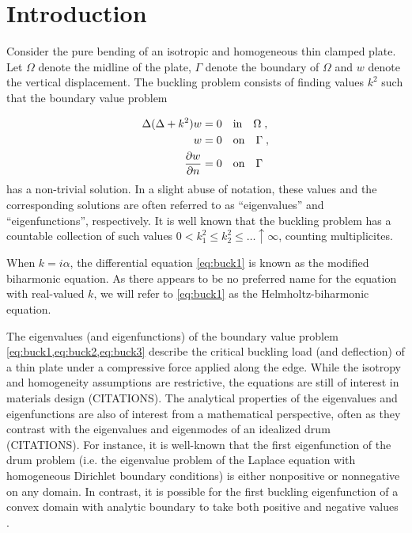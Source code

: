 \section{Introduction}


Consider the pure bending of an isotropic and homogeneous thin clamped
plate. 
Let $\Omega$ denote the midline of the plate, $\Gamma$ denote the 
boundary of $\Omega$ and $w$ denote the vertical displacement.
The buckling problem consists of finding 
values $k^{2}$ such that the boundary value problem

\begin{align}
\Delta (\Delta + k^2) w &= 0 \quad \textrm{in} \quad \Omega \label{eq:buck1} \; , \\
w &= 0 \quad \textrm{on} \quad \Gamma \label{eq:buck2} \; ,\\
\frac{\partial w}{\partial n} &=0 \quad \textrm{on} \quad \Gamma \label{eq:buck3} 
\end{align}
has a non-trivial solution. In a slight abuse of notation,
these values and the corresponding solutions are often
referred to as ``eigenvalues'' and ``eigenfunctions'',
respectively. 
It is well known that the buckling problem has a
countable collection of such values
$0 < k_{1}^{2} \leq k_{2}^2 \leq \ldots \uparrow \infty$,
counting multiplicites.

\begin{remark}
  When $k = i\alpha$, the differential equation
  \cref{eq:buck1} is known as the modified biharmonic
  equation. As there appears to be no preferred
  name for the equation with real-valued $k$,
  we will refer to \cref{eq:buck1} as the
  Helmholtz-biharmonic equation.
\end{remark}

The eigenvalues (and eigenfunctions)
of the boundary value problem \cref{eq:buck1,eq:buck2,eq:buck3}
describe the critical buckling load (and deflection)
of a thin plate under
a compressive force applied along the edge. While the
isotropy and homogeneity assumptions are restrictive,
the equations are still of interest in materials design
(CITATIONS). The analytical properties of the eigenvalues and
eigenfunctions are also of interest from a mathematical
perspective, often as they contrast with the eigenvalues
and eigenmodes of an idealized drum (CITATIONS). For instance,
it is well-known that the first eigenfunction of the
drum problem (i.e. the eigenvalue problem of the Laplace
equation with homogeneous Dirichlet boundary conditions)
is either nonpositive or nonnegative on any domain.
In contrast, it is possible for the first buckling
eigenfunction of a convex domain with analytic boundary
to take both positive and negative values \cite{antunes2011buckling}.

